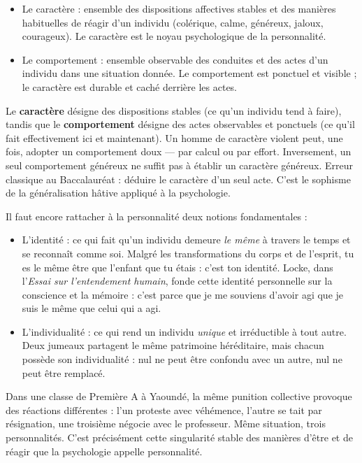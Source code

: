 \documentclass[11pt]{article}
\newcommand{\cle}[1]{{\popxbold\color{popdark}#1}}
\begin{document}
\begin{itemize}
\item Le \cle{caractère} : ensemble des dispositions affectives stables et des manières habituelles de réagir d'un individu (colérique, calme, généreux, jaloux, courageux). Le caractère est le noyau psychologique de la personnalité.
\item Le \cle{comportement} : ensemble observable des conduites et des actes d'un individu dans une situation donnée. Le comportement est ponctuel et visible ; le caractère est durable et caché derrière les actes.
\end{itemize}

\begin{attention}
Le \textbf{caractère} désigne des dispositions stables (ce qu'un individu tend à faire), tandis que le \textbf{comportement} désigne des actes observables et ponctuels (ce qu'il fait effectivement ici et maintenant). Un homme de caractère violent peut, une fois, adopter un comportement doux — par calcul ou par effort. Inversement, un seul comportement généreux ne suffit pas à établir un caractère généreux. Erreur classique au Baccalauréat : déduire le caractère d'un seul acte. C'est le sophisme de la généralisation hâtive appliqué à la psychologie.
\end{attention}

Il faut encore rattacher à la personnalité deux notions fondamentales :

\begin{itemize}
\item L'\cle{identité} : ce qui fait qu'un individu demeure \emph{le même} à travers le temps et se reconnaît comme soi. Malgré les transformations du corps et de l'esprit, tu es le même être que l'enfant que tu étais : c'est ton identité. Locke, dans l'\emph{Essai sur l'entendement humain}, fonde cette identité personnelle sur la conscience et la mémoire : c'est parce que je me souviens d'avoir agi que je suis le même que celui qui a agi.
\item L'\cle{individualité} : ce qui rend un individu \emph{unique} et irréductible à tout autre. Deux jumeaux partagent le même patrimoine héréditaire, mais chacun possède son individualité : nul ne peut être confondu avec un autre, nul ne peut être remplacé.
\end{itemize}

\begin{exemplebox}
Dans une classe de Première A à Yaoundé, la même punition collective provoque des réactions différentes : l'un proteste avec véhémence, l'autre se tait par résignation, une troisième négocie avec le professeur. Même situation, trois personnalités. C'est précisément cette singularité stable des manières d'être et de réagir que la psychologie appelle personnalité.
\end{exemplebox}
\end{document}
